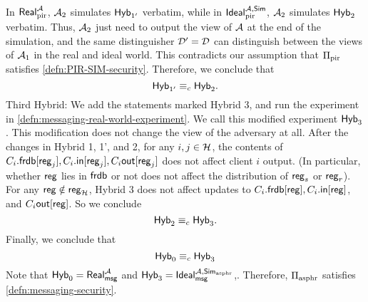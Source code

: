 In $\mathsf{Real}_{\text{pir}}^{\mathcal{A}}$, $\mathcal{A}_2$ simulates $\mathsf{Hyb}_{1'}$ verbatim, while in $\mathsf{Ideal}_{\text{pir}}^{\mathcal{A}, \mathsf{Sim}}$, $\mathcal{A}_2$ simulates $\mathsf{Hyb}_2$ verbatim. Thus, $\mathcal{A}_2$ just need to output the view of $\mathcal{A}$ at the end of the simulation, and the same distinguisher $\mathcal{D}' = \mathcal{D}$ can distinguish between the views of $\mathcal{A}_1$ in the real and ideal world. This contradicts our assumption that $\Pi_{\text{pir}}$ satisfies \cref{defn:PIR-SIM-security}. Therefore, we conclude that
$$\mathsf{Hyb}_{1'} \equiv_c \mathsf{Hyb}_2.$$
Third Hybrid: We add the statements marked Hybrid 3, and run the experiment in \cref{defn:messaging-real-world-experiment}. We call this modified experiment $\mathsf{Hyb}_{3}$. This modification does not change the view of the adversary at all. After the changes in Hybrid 1, 1', and 2, for any $i, j \in \mathcal{H}$, the contents of $C_i.\mathsf{frdb}[\mathsf{reg}_j], C_i.\mathsf{in}[\mathsf{reg}_j], C_i\mathsf{out}[\mathsf{reg}_j]$ does not affect client $i$ output. (In particular, whether $\mathsf{reg}$ lies in $\mathsf{frdb}$ or not does not affect the distribution of $\mathsf{reg}_s$ or $\mathsf{reg}_r$). For any $\mathsf{reg} \notin \mathsf{reg}_{\mathcal{H}}$, Hybrid 3 does not affect updates to $C_i.\mathsf{frdb}[\mathsf{reg}], C_i.\mathsf{in}[\mathsf{reg}]$, and $C_i\mathsf{out}[\mathsf{reg}]$. So we conclude
$$\mathsf{Hyb}_{2} \equiv_c \mathsf{Hyb}_3.$$
Finally, we conclude that
$$\mathsf{Hyb}_0 \equiv_c \mathsf{Hyb}_3$$
Note that $\mathsf{Hyb}_0 = \mathsf{Real}_{\mathsf{msg}}^{\mathcal{A}}$ and $\mathsf{Hyb}_3 = \mathsf{Ideal}_{\mathsf{msg}}^{\mathcal{A}, \mathsf{Sim}_{\text{asphr}}}$,. Therefore, $\Pi_{\text{asphr}}$ satisfies \cref{defn:messaging-security}.
